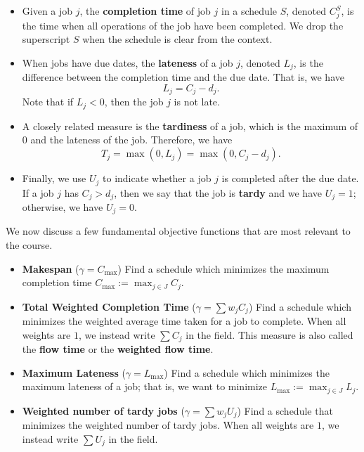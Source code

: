\begin{itemize}

    \item Given a job $j$, the {\bf completion time} of job $j$ in a schedule 
    $S$, denoted $C_j^S$, is the time when all operations of the job have 
    been completed. We drop the superscript $S$ when the schedule is clear 
    from the context.

    \item When jobs have due dates, the {\bf lateness} of a job $j$, 
    denoted $L_j$, is the difference between the completion time and the 
    due date. That is, we have 
    \[ L_j = C_j - d_j. \] 
    Note that if $L_j < 0$, then the job $j$ is not late. 

    \item A closely related measure is the {\bf tardiness} of a job, 
    which is the maximum of $0$ and the lateness of the job. Therefore, 
    we have 
    \[ T_j = \max(0, L_j) = \max(0, C_j - d_j). \] 
    
    \item Finally, we use $U_j$ to indicate whether a job $j$ is completed 
    after the due date. If a job $j$ has $C_j > d_j$, then we say that 
    the job is {\bf tardy} and we have $U_j = 1$; otherwise, we have $U_j = 0$. 

\end{itemize}  

We now discuss a few fundamental objective functions that are most relevant 
to the course.

\begin{itemize}

    \item {\bf Makespan} ($\gamma = C_{\max}$) Find a schedule which minimizes 
    the maximum completion time $C_{\max} := \max_{j\in J} C_j$.

    \item {\bf Total Weighted Completion Time} ($\gamma = \sum w_j C_j$)
    Find a schedule which minimizes the weighted average time taken for a 
    job to complete. When all weights are $1$, we instead write 
    $\sum C_j$ in the field. This measure is also called the {\bf flow time}
    or the {\bf weighted flow time}.

    \item {\bf Maximum Lateness} ($\gamma = L_{\max}$) Find a schedule 
    which minimizes the maximum lateness of a job; that is, we want to 
    minimize $L_{\max} := \max_{j\in J} L_j$. 

    \item {\bf Weighted number of tardy jobs} ($\gamma = \sum w_j U_j$)
    Find a schedule that minimizes the weighted number of tardy jobs.
    When all weights are $1$, we instead write $\sum U_j$ in the field. 

\end{itemize}

